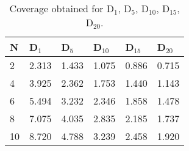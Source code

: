\begin{table}[t!]
	\small
	\caption{Coverage obtained for D$_{1}$, D$_{5}$, D$_{10}$, D$_{15}$, D$_{20}$.}
	\begin{tabular}{|p{1.10cm}|p{0.95cm}|p{0.95cm}|p{0.95cm}|p{0.95cm}|p{0.95cm}|} \hline
\textbf{N} & \textbf{ D$_{1}$} & \textbf{D$_{5}$} & \textbf{ D$_{10}$} & \textbf{D$_{15}$} & \textbf{D$_{20}$} \\ \hline
		2                & 2.313                                                                    & 1.433                                                                    & 1.075                                                                     & 0.886                                                                     & 0.715                                                                     \\ \hline
		4                & 3.925                                                                    & 2.362                                                                    & 1.753                                                                     & 1.440                                                                     & 1.143                                                                     \\ \hline
		6                & 5.494                                                                    & 3.232                                                                    & 2.346                                                                     & 1.858                                                                     & 1.478                                                                     \\ \hline
		8                & 7.075                                                                    & 4.035                                                                    & 2.835                                                                     & 2.185                                                                     & 1.737                                                                     \\ \hline
		10               & 8.720                                                                    & 4.788                                                                    & 3.239                                                                     & 2.458                                                                     & 1.920                                                                     \\ \hline

\end{tabular}
\end{table}
